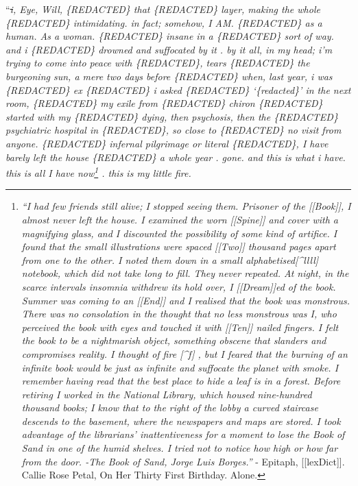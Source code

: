 \documentclass[
]{article}
\begin{document}
``\emph{\st{i}, Eye, Will, \{REDACTED\} that \{REDACTED\} layer, making
the whole \{REDACTED\} intimidating. in fact; somehow, I AM.
\{REDACTED\} as a human. As a woman. \{REDACTED\} insane in a
\{REDACTED\} sort of way. and i \{REDACTED\} drowned and suffocated by
it . by it all, in my head; i'm trying to come into peace with
\{REDACTED\}, tears \{REDACTED\} the burgeoning sun, a mere two days
before \{REDACTED\} when, last year, i was \{REDACTED\} ex \{REDACTED\}
i asked \{REDACTED\} `\{redacted\}' in the next room, \{REDACTED\} my
exile from \{REDACTED\} chiron \{REDACTED\} started with my \{REDACTED\}
dying, then psychosis, then the \{REDACTED\} psychiatric hospital in
\{REDACTED\}, so close to \{REDACTED\} no visit from anyone.
\{REDACTED\} infernal pilgrimage or literal \{REDACTED\}, I have barely
left the house \{REDACTED\} a whole year . gone. and this is what i
have. this is all I have now\footnote{\emph{``I had few friends still
  alive; I stopped seeing them. Prisoner of the {[}{[}Book{]}{]}, I
  almost never left the house. I examined the worn {[}{[}Spine{]}{]} and
  cover with a magnifying glass, and I discounted the possibility of
  some kind of artifice. I found that the small illustrations were
  spaced {[}{[}Two{]}{]} thousand pages apart from one to the other. I
  noted them down in a small alphabetised{[}\^{}llll{]} notebook, which
  did not take long to fill. They never repeated. At night, in the
  scarce intervals insomnia withdrew its hold over, I
  {[}{[}Dream{]}{]}ed of the book. Summer was coming to an
  {[}{[}End{]}{]} and I realised that the book was monstrous. There was
  no consolation in the thought that no less monstrous was I, who
  perceived the book with eyes and touched it with {[}{[}Ten{]}{]}
  nailed fingers. I felt the book to be a nightmarish object, something
  obscene that slanders and compromises reality. I thought of fire
  {[}\^{}f{]} , but I feared that the burning of an infinite book would
  be just as infinite and suffocate the planet with smoke. I remember
  having read that the best place to hide a leaf is in a forest. Before
  retiring I worked in the National Library, which housed nine-hundred
  thousand books; I know that to the right of the lobby a curved
  staircase descends to the basement, where the newspapers and maps are
  stored. I took advantage of the librarians' inattentiveness for a
  moment to lose the Book of Sand in one of the humid shelves. I tried
  not to notice how high or how far from the door. -The Book of Sand,
  Jorge Luis Borges.''} - Epitaph, {[}{[}lexDict{]}{]}. Callie Rose
  Petal, On Her Thirty First Birthday. Alone.} . this is my little fire.
}
\end{document}
